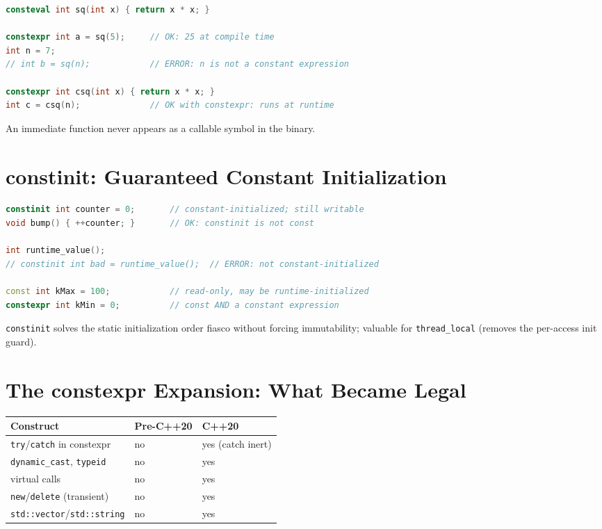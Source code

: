 \begin{lstlisting}[language=C++,caption={consteval forces compile-time evaluation}]
consteval int sq(int x) { return x * x; }

constexpr int a = sq(5);     // OK: 25 at compile time
int n = 7;
// int b = sq(n);            // ERROR: n is not a constant expression

constexpr int csq(int x) { return x * x; }
int c = csq(n);              // OK with constexpr: runs at runtime
\end{lstlisting}

An immediate function never appears as a callable symbol in the binary.

\section{constinit: Guaranteed Constant Initialization}
\label{sec:c20-constinit}

\begin{lstlisting}[language=C++,caption={constinit guarantees constant init but allows mutation}]
constinit int counter = 0;       // constant-initialized; still writable
void bump() { ++counter; }       // OK: constinit is not const

int runtime_value();
// constinit int bad = runtime_value();  // ERROR: not constant-initialized

const int kMax = 100;            // read-only, may be runtime-initialized
constexpr int kMin = 0;          // const AND a constant expression
\end{lstlisting}

\texttt{constinit} solves the static initialization order fiasco without forcing immutability; valuable for \texttt{thread\_local} (removes the per-access init guard).

\section{The constexpr Expansion: What Became Legal}
\label{sec:c20-constexpr-expansion}

\begin{center}
\begin{tabular}{lll}
\hline
\textbf{Construct} & \textbf{Pre-C++20} & \textbf{C++20} \\
\hline
\texttt{try}/\texttt{catch} in constexpr & no & yes (catch inert) \\
\texttt{dynamic\_cast}, \texttt{typeid} & no & yes \\
virtual calls & no & yes \\
\texttt{new}/\texttt{delete} (transient) & no & yes \\
\texttt{std::vector}/\texttt{std::string} & no & yes \\
\hline
\end{tabular}
\end{center}

